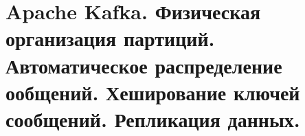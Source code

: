 \section{Apache Kafka. Физическая организация партиций. Автоматическое распределение ообщений. Хеширование ключей сообщений. Репликация данных.}
